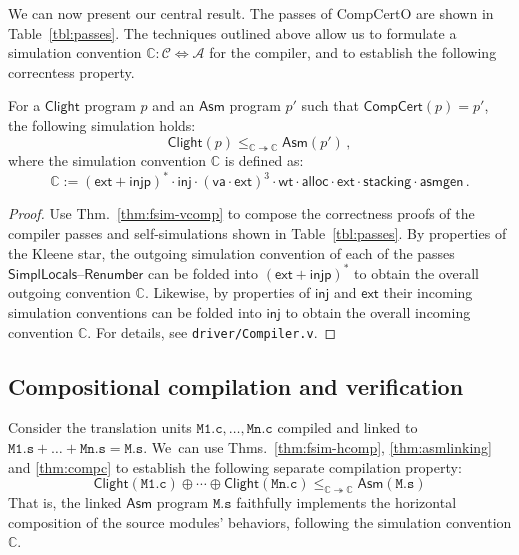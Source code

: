 \documentclass[acmsmall,screen,review,anonymous]{acmart}
\newcommand{\kw}[1]{\ensuremath{ \mathsf{#1} }}
\newenvironment{optional}{\begin{color}{gray}}{\end{color}}
\begin{document}
We can now present our central result.
The passes of CompCertO are shown in Table~\ref{tbl:passes}.
The techniques outlined above allow us to formulate
a simulation convention
$\mathbb{C} : \mathcal{C} \Leftrightarrow \mathcal{A}$
for the compiler, %
and to establish the following correcntess property.

\begin{theorem} \label{thm:compc} %
For a \kw{Clight} program $p$
and an \kw{Asm} program $p'$ such that
$\kw{CompCert}(p) = p'$,
the following simulation holds:
\[
    \kw{Clight}(p) \le_{\mathbb{C} \twoheadrightarrow \mathbb{C}}
    \kw{Asm}(p') \,,
\]
where the simulation convention $\mathbb{C}$ is defined as:
\[
    \mathbb{C} := (\kw{ext} + \kw{injp})^* \cdot \kw{inj} \cdot
      (\kw{va} \cdot \kw{ext})^3 \cdot
      \kw{wt} \cdot \kw{alloc} \cdot
      \kw{ext} \cdot %
      \kw{stacking} \cdot
      \kw{asmgen}
      \,.
\]
\begin{proof}
Use Thm.~\ref{thm:fsim-vcomp} to compose
the correctness proofs of the compiler passes and
self-simulations shown in Table~\ref{tbl:passes}.
By properties of the Kleene star,
the outgoing simulation convention of each of the
passes \kw{SimplLocals}--\kw{Renumber} %
can be folded into $(\kw{ext} + \kw{injp})^*$
to obtain the overall outgoing convention $\mathbb{C}$.
Likewise, by properties of $\kw{inj}$ and $\kw{ext}$
their incoming simulation conventions
can be folded into $\kw{inj}$
to obtain the overall incoming convention $\mathbb{C}$.
For details, see \texttt{driver/Compiler.v}.
\end{proof}
\end{theorem}


\subsection{Compositional compilation and verification} \label{sec:cver} %

Consider the translation units
$\mathtt{M1.c}, \ldots, \mathtt{Mn.c}$
compiled and linked to
$\mathtt{M1.s} + \ldots + \mathtt{Mn.s} = \mathtt{M.s}$.
We~can use
Thms.~\ref{thm:fsim-hcomp},
\ref{thm:asmlinking} and
\ref{thm:compc}
to establish the following separate compilation property:
\begin{equation}
  \label{eqn:sepcomp}
  \kw{Clight}(\mathtt{M1.c}) \oplus \cdots \oplus \kw{Clight}(\mathtt{Mn.c})
  \le_{\mathbb{C} \twoheadrightarrow \mathbb{C}}
  \kw{Asm}(\mathtt{M.s})
\end{equation}
That is,
the linked \kw{Asm} program
$\mathtt{M.s}$
faithfully implements
the horizontal composition of the source modules' behaviors,
following the simulation convention $\mathbb{C}$.
\end{document}
